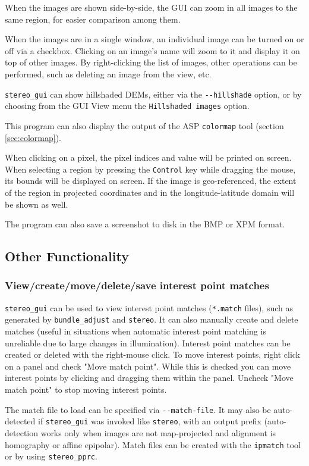 When the images are shown side-by-side, the GUI can zoom
in all images to the same region, for easier comparison among them.

When the images are in a single window, an individual image can be turned
on or off via a checkbox. Clicking on an image's name will zoom to it
and display it on top of other images. By right-clicking the list
of images, other operations can be performed, such as deleting an image
from the view, etc. 

\texttt{stereo\_gui} can show hillshaded DEMs, either via the
\texttt{-\/-hillshade} option, or by choosing from the GUI View menu the
\texttt{Hillshaded images} option.

This program can also display the output of the ASP \texttt{colormap}
tool (section \ref{sec:colormap}).

When clicking on a pixel, the pixel indices and value will be printed on screen.
When selecting a region by pressing the \texttt{Control} key while dragging the mouse, 
its bounds will be displayed on screen. If the image is geo-referenced,
the extent of the region in projected coordinates and in the longitude-latitude domain 
will be shown as well. 

The program can also save a screenshot to disk in the BMP or XPM format. 

\subsection{Other Functionality}

\subsubsection{View/create/move/delete/save interest point matches}

\texttt{stereo\_gui} can be used to view interest point matches
(\texttt{*.match} files), such as generated by \texttt{bundle\_adjust}
and \texttt{stereo}. It can also manually create and delete matches
(useful in situations when automatic interest point matching is
unreliable due to large changes in illumination). Interest point matches
can be created or deleted with the right-mouse click. To move interest
points, right click on a panel and check "Move match point". While this is
checked you can move interest points by clicking and dragging them within
the panel. Uncheck "Move match point" to stop moving interest points.

The match file to load can be specified via \texttt{-\/-match-file}.  It
may also be auto-detected if \texttt{stereo\_gui} was invoked like
\texttt{stereo}, with an output prefix (auto-detection works only when
images are not map-projected and alignment is homography or affine
epipolar).  Match files can be created with the \texttt{ipmatch} tool
or by using \texttt{stereo\_pprc}.

